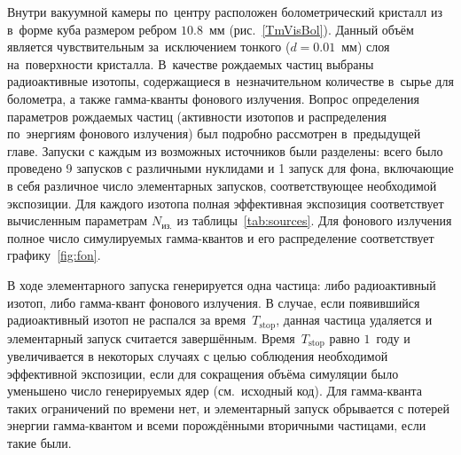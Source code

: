 \documentclass[a4paper,article,14pt]{extarticle}
\begin{document}
Внутри вакуумной камеры по~центру расположен болометрический кристалл из~{\TmAlO} в~форме куба размером ребром $10.8$~мм (рис.~\ref{TmVisBol}).
Данный объём является чувствительным за~исключением тонкого ($d=0.01$~мм) слоя на~поверхности кристалла.
В~качестве рождаемых частиц выбраны радиоактивные изотопы, содержащиеся в~незначительном количестве в~сырье для болометра, а также гамма-кванты фонового излучения.
Вопрос определения параметров рождаемых частиц (активности изотопов и распределения по~энергиям фонового излучения) был подробно рассмотрен в~предыдущей главе.
Запуски с каждым из возможных источников были разделены: всего было проведено 9 запусков с различными нуклидами и 1 запуск для фона, включающие в себя различное число элементарных запусков, соответствующее необходимой экспозиции.
Для каждого изотопа полная эффективная экспозиция соответствует вычисленным параметрам $N_{\text{из.}}$ из таблицы~\ref{tab:sources}.
Для фонового излучения полное число симулируемых гамма-квантов и его распределение соответствует графику~\ref{fig:fon}.

В ходе элементарного запуска генерируется одна частица: либо радиоактивный изотоп, либо гамма-квант фонового излучения.
В случае, если появившийся радиоактивный изотоп не распался за время~$T_{\mathrm{stop}}$, данная частица удаляется и элементарный запуск считается завершённым.
Время~$T_{\mathrm{stop}}$ равно $1$~году и увеличивается в некоторых случаях с целью соблюдения необходимой эффективной экспозиции, если  для сокращения объёма симуляции было уменьшено число генерируемых ядер (см.~исходный код).
Для гамма-кванта таких ограничений по времени нет, и элементарный запуск обрывается с потерей энергии гамма-квантом и всеми порождёнными вторичными частицами, если такие были.
\end{document}
